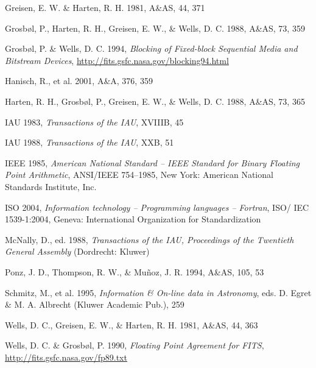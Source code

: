 \documentclass[onecolumn]{aa}
\begin{document}
\begin{thebibliography}{9999}
 Greisen, E. W. \& Harten, R. H. 1981, 
  A\&AS, 44, 371
          
 Grosb\o l, P., Harten, R. H., Greisen, E. W., \& Wells, D. C. 1988, 
 A\&AS, 73, 359 
  
 Grosb\o l, P. \& Wells, D. C. 1994, {\it Blocking of Fixed-block
   Sequential Media and Bitstream Devices}, \url{http://fits.gsfc.nasa.gov/blocking94.html}

 Hanisch, R., et al. 2001,  A\&A, 376, 359  

 Harten, R. H., Grosb\o l, P., Greisen, E. W., \& Wells, D. C. 1988, 
    A\&AS, 73, 365 


 IAU 1983, {\it Transactions of the IAU}, XVIIIB, 45

 IAU 1988, {\it Transactions of the IAU}, XXB, 51

  IEEE 1985, {\it American National Standard -- 
       IEEE Standard for Binary 
       Floating Point Arithmetic}, ANSI/IEEE 754--1985,
       New York: American
        National Standards Institute, Inc.

 ISO 2004, {\it Information technology -- Programming 
      languages -- Fortran},  ISO/ IEC 1539-1:2004, Geneva: 
      International Organization for Standardization
   
 McNally, D., ed. 1988, {\it Transactions
 of the IAU, Proceedings of 
 the Twentieth General Assembly} (Dordrecht: Kluwer)

 Ponz, J. D., Thompson, R. W., \& Mu\~{n}oz, J. R. 1994,
   A\&AS, 105, 53 
  
 Schmitz, M., et al. 1995, 
{\it Information \& On-line data in Astronomy},
eds. D. Egret \& M. A. Albrecht (Kluwer Academic Pub.), 259 

 Wells, D. C., Greisen, E. W., \& Harten, R. H. 1981,  
 A\&AS,  44, 363 

 Wells, D. C. \& Grosb\o l, P. 1990, {\it Floating Point Agreement
   for
   {\em FITS}}, \url{http://fits.gsfc.nasa.gov/fp89.txt}


\end{thebibliography}

\ifiaufwgstyle
  
\fi

\end{document}
